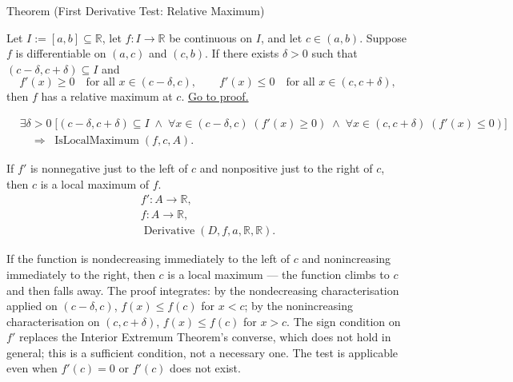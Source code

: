\begin{theorembox}{Theorem (First Derivative Test: Relative Maximum)}
\begin{theorem}
\label{thm:first-derivative-test-maximum}
Let $I := [a,b] \subseteq \mathbb{R}$, let $f : I \to \mathbb{R}$ be continuous on $I$, and let $c \in (a,b)$. Suppose $f$ is differentiable on $(a,c)$ and $(c,b)$. If there exists $\delta > 0$ such that $(c-\delta,c+\delta) \subseteq I$ and
\[
f'(x) \geq 0 \quad \text{for all } x \in (c-\delta,c),
\qquad
f'(x) \leq 0 \quad \text{for all } x \in (c,c+\delta),
\]
then $f$ has a relative maximum at $c$.
\hyperref[prf:first-derivative-test-maximum]{Go to proof.}
\end{theorem}
\end{theorembox}

\begin{remark*}
\begin{align*}
&\exists \delta > 0\;\bigl[(c-\delta,c+\delta)\subseteq I
\;\land\;
\forall x\in(c-\delta,c)\;(f'(x)\geq 0)
\;\land\;
\forall x\in(c,c+\delta)\;(f'(x)\leq 0)\bigr]\\
&\quad\Rightarrow\; \operatorname{IsLocalMaximum}(f,c,A).
\end{align*}
\end{remark*}

\begin{remark*}
If $f'$ is nonnegative just to the left of $c$ and nonpositive just to the
right of $c$, then $c$ is a local maximum of $f$.
\[
\begin{aligned}
  f'\colon A\to\mathbb{R},\\
  f\colon A\to\mathbb{R},\\
  \operatorname{Derivative}(D,f,a,\mathbb{R},\mathbb{R}).
\end{aligned}
\]
\end{remark*}

\begin{remark*}[Interpretation]
If the function is nondecreasing immediately to the left of $c$ and nonincreasing immediately to the right, then $c$ is a local maximum --- the function climbs to $c$ and then falls away. The proof integrates: by the nondecreasing characterisation applied on $(c-\delta,c)$, $f(x) \leq f(c)$ for $x < c$; by the nonincreasing characterisation on $(c,c+\delta)$, $f(x) \leq f(c)$ for $x > c$. The sign condition on $f'$ replaces the Interior Extremum Theorem's converse, which does not hold in general; this is a sufficient condition, not a necessary one. The test is applicable even when $f'(c) = 0$ or $f'(c)$ does not exist.
\end{remark*}

